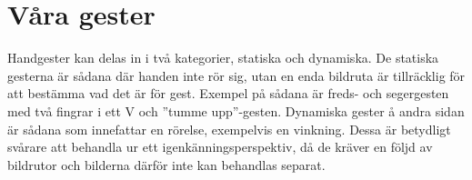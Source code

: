 \documentclass[../rapport_MVEX01-11-05]{subfiles}
\begin{document}
\section{Våra gester}
Handgester kan delas in i två kategorier, statiska och dynamiska. De
statiska gesterna är sådana där handen inte rör sig, utan en enda
bildruta är tillräcklig för att bestämma vad det är för gest. Exempel på
sådana är freds- och segergesten med två fingrar i ett V och ''tumme
upp''-gesten. Dynamiska gester å andra sidan är sådana som innefattar en
rörelse, exempelvis en vinkning. Dessa är betydligt svårare att
behandla ur ett igenkänningsperspektiv, då de kräver en följd av
bildrutor och bilderna därför inte kan behandlas separat.

\begin{figure}[tb]
	\centering 
\end{figure}
\end{document}
